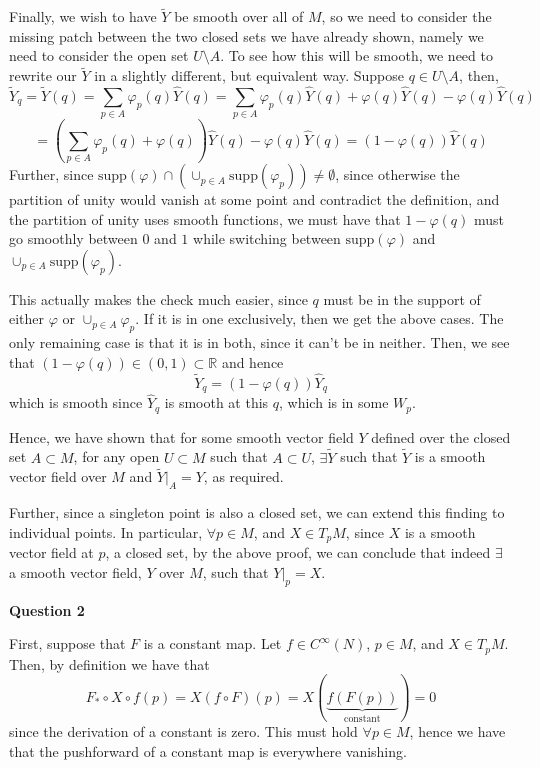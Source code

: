 \documentclass[10pt]{article}
\newcommand{\R}{\mathbb{R}}
\begin{document}
Finally, we wish to have $\tilde{Y}$ be smooth over all of $M$, so we need to consider the missing patch between the two closed sets we have already shown, namely we need to consider the open set $U \setminus A$. To see how this will be smooth, we need to rewrite our $\tilde{Y}$ in a slightly different, but equivalent way. Suppose $q\in U\setminus A$, then,
\[ \tilde{Y}_{q} = \tilde{Y}(q) = \sum_{p\in A}\varphi_{p}(q)\hat{Y}(q) = \sum_{p\in A}\varphi_{p}(q)\hat{Y}(q) + \varphi(q)\hat{Y}(q) - \varphi(q)\hat{Y}(q)\]
\[ = \left(\sum_{p\in A}\varphi_{p}(q) + \varphi(q)\right)\hat{Y}(q) - \varphi(q)\hat{Y}(q) = (1 - \varphi(q))\hat{Y}(q) \]
Further, since $\text{supp}(\varphi)\cap\left(\cup_{p\in A}\text{supp}(\varphi_{p})\right) \neq \emptyset$, since otherwise the partition of unity would vanish at some point and contradict the definition, and the partition of unity uses smooth functions, we must have that $1 - \varphi(q)$ must go smoothly between $0$ and $1$ while switching between $\text{supp}(\varphi)$ and $\cup_{p\in A}\text{supp}(\varphi_{p})$.

This actually makes the check much easier, since $q$ must be in the support of either $\varphi$ or $\cup_{p\in A}\varphi_{p}$. If it is in one exclusively, then we get the above cases. The only remaining case is that it is in both, since it can't be in neither. Then, we see that $(1-\varphi(q)) \in (0,1)\subset \R$ and hence
\[ \tilde{Y}_{q} = (1-\varphi(q))\hat{Y}_{q} \]
which is smooth since $\hat{Y}_{q}$ is smooth at this $q$, which is in some $W_{p}$.

Hence, we have shown that for some smooth vector field $Y$ defined over the closed set $A\subset M$, for any open $U\subset M$ such that $A\subset U$, $\exists \tilde{Y}$ such that $\tilde{Y}$ is a smooth vector field over $M$ and $\tilde{Y}|_{A} = Y$, as required.

Further, since a singleton point is also a closed set, we can extend this finding to individual points. In particular, $\forall p \in M$, and $X \in T_{p}M$, since $X$ is a smooth vector field at $p$, a closed set, by the above proof, we can conclude that indeed $\exists$ a smooth vector field, $Y$ over $M$, such that $Y|_{p} = X$.

\newpage
\textbf{Question 2}

First, suppose that $F$ is a constant map. Let $f\in C^{\infty}(N)$, $p\in M$, and $X \in T_{p}M$. Then, by definition we have that
\[ F_{*}\circ X\circ f (p) = X(f\circ F)(p) = X(\underbrace{f(F(p))}_{\text{constant}}) = 0 \]
since the derivation of a constant is zero. This must hold $\forall p\in M$, hence we have that the pushforward of a constant map is everywhere vanishing.
\end{document}
